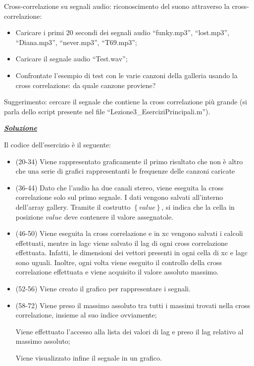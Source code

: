 \documentclass[a4paper]{article}
\newcommand{\dquotes}[1]{``#1''}
\begin{document}
	Cross-correlazione su segnali audio: riconoscimento del suono attraverso la cross-correlazione:
	\begin{itemize}
		\item Caricare i primi 20 secondi dei segnali audio \dquotes{\textsf{funky.mp3}}, \dquotes{\textsf{lost.mp3}}, \dquotes{\textsf{Diana.mp3}}, \dquotes{\textsf{never.mp3}}, \dquotes{\textsf{T69.mp3}};
		
		\item Caricare il segnale audio \dquotes{\textsf{Test.wav}};
		
		\item Confrontate l'esempio di test con le varie canzoni della galleria usando la cross correlazione: da quale canzone proviene?
	\end{itemize}
	Suggerimento: cercare il segnale che contiene la cross correlazione più grande (si parla dello script presente nel file \dquotes{\textsf{Lezione3\_EserciziPrincipali.m}}).\newline
	
	\noindent
	\textcolor{Green4}{\textbf{\emph{\underline{Soluzione}}}}\newline
	
	\noindent
	Il codice dell'esercizio è il seguente:
	
	
	\begin{itemize}
		\item (20-34) Viene rappresentato graficamente il primo risultato che non è altro che una serie di grafici rappresentanti le frequenze delle canzoni caricate
		
		\item (36-44) Dato che l'audio ha due canali stereo, viene eseguita la cross correlazione solo sul primo segnale. I dati vengono salvati all'interno dell'array \textsf{gallery}. Tramite il costrutto \textsf{$\left\{value\right\}$}, si indica che la cella in posizione $value$ deve contenere il valore assegnatole.
		
		\item (46-50) Viene eseguita la cross correlazione e in \textsf{xc} vengono salvati i calcoli effettuati, mentre in \textsf{lagc} viene salvato il lag di ogni cross correlazione effettuata. Infatti, le dimensioni dei vettori presenti in ogni cella di \textsf{xc} e \textsf{lagc} sono uguali.\newline
		Inoltre, ogni volta viene eseguito il controllo della cross correlazione effettuata e viene acquisito il valore assoluto massimo.
		
		\item (52-56) Viene creato il grafico per rappresentare i segnali.
		
		\item (58-72) Viene preso il massimo assoluto tra tutti i massimi trovati nella cross correlazione, insieme al suo indice ovviamente; 
		
		Viene effettuato l'accesso alla lista dei valori di lag e preso il lag relativo al massimo assoluto;
		
		Viene visualizzato infine il segnale in un grafico.
	\end{itemize}\newpage
	
\end{document}
